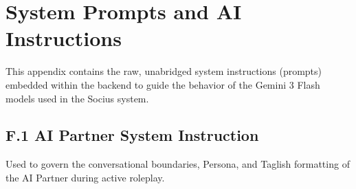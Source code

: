 
\chapter{System Prompts and AI Instructions}
\label{sec:appendixf}

This appendix contains the raw, unabridged system instructions (prompts) embedded within the backend to guide the behavior of the Gemini 3 Flash models used in the Socius system.

\section*{F.1 AI Partner System Instruction}
Used to govern the conversational boundaries, Persona, and Taglish formatting of the AI Partner during active roleplay.

